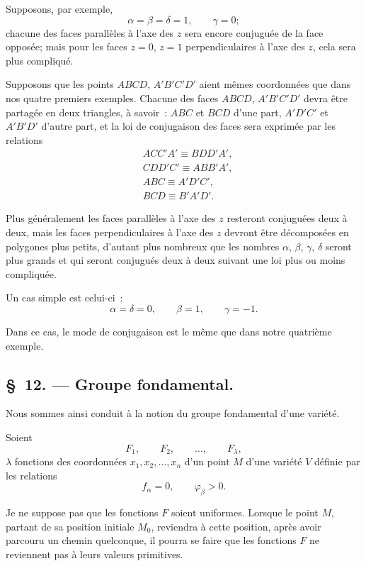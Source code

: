 \documentclass{article}
\begin{document}
Supposons, par exemple,
\[ \alpha = \beta = \delta = 1, \qquad \gamma = 0; \]
chacune des faces parallèles à l'axe des $z$ sera encore conjuguée de la face opposée; mais pour les faces $z = 0$, $z = 1$ perpendiculaires à l'axe des $z$, cela sera plus compliqué.

Supposons que les points $ABCD$, $A'B'C'D'$ aient mêmes coordonnées que dans nos quatre premiers exemples. Chacune des faces $ABCD$, $A'B'C'D'$ devra être partagée en deux triangles, à savoir~: $ABC$ et $BCD$ d'une part, $A'D'C'$ et $A'B'D'$ d'autre part, et la loi de conjugaison des faces sera exprimée par les relations
\[ \begin{aligned} &ACC'A' \equiv BDD'A',\\ &CDD'C' \equiv ABB'A',\\ &ABC \equiv A'D'C',\\ &BCD \equiv B'A'D'. \end{aligned} \]

Plus généralement les faces parallèles à l'axe des $z$ resteront conjuguées deux à deux, mais les faces perpendiculaires à l'axe des $z$ devront être décomposées en polygones plus petits, d'autant plus nombreux que les nombres $\alpha$, $\beta$, $\gamma$, $\delta$ seront plus grands et qui seront conjugués deux à deux suivant une loi plus ou moins compliquée.

Un cas simple est celui-ci~:
\[ \alpha = \delta = 0, \qquad \beta = 1, \qquad \gamma = -1. \]

Dans ce cas, le mode de conjugaison est le même que dans notre quatrième exemple.

\subsection*{\S~12. --- Groupe fondamental.}

Nous sommes ainsi conduit à la notion du groupe fondamental d'une variété.

Soient
\[ F_{1}, \qquad F_{2}, \qquad \ldots, \qquad F_{\lambda}, \]
$\lambda$ fonctions des coordonnées $x_{1}, x_{2}, \ldots, x_{n}$ d'un point $M$ d'une variété $V$ définie par les relations
\[ f_{\alpha} = 0, \qquad \varphi_{\beta} > 0. \]

Je ne suppose pas que les fonctions $F$ soient uniformes. Lorsque le point $M$, partant de sa position initiale $M_{0}$, reviendra à cette position, après avoir parcouru un chemin quelconque, il pourra se faire que les fonctions $F$ ne reviennent pas à leurs valeurs primitives.
\end{document}
